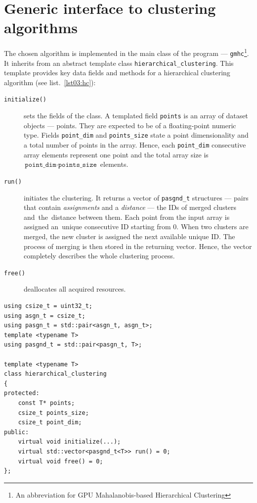 \section{Generic interface to clustering algorithms}

The chosen algorithm is implemented in the main class of the program --- \texttt{gmhc}\footnote{An abbreviation for GPU Mahalanobis-based Hierarchical Clustering}. It inherits from an abstract template class \texttt{hierarchical\_clustering}.
This template provides key data fields and methods for a hierarchical clustering algorithm (see list.~\ref{lst03:hc}): 

\begin{description}
	\item[\texttt{initialize()}] sets the fields of the class. A templated field \texttt{points} is an array of dataset objects --- points. They are expected to be of a floating-point numeric type. Fields \texttt{point\_dim} and \texttt{points\_size} state a point dimensionality and a total number of points in the array. Hence, each \texttt{point\_dim} consecutive array elements represent one point and the total array size is~$\texttt{point\_dim}\cdot\texttt{points\_size}$ elements.
	
	\item[\texttt{run()}] initiates the clustering. It returns a vector of \texttt{pasgnd\_t} structures --- pairs that contain \emph{assignments} and a \emph{distance} --- the IDs of merged clusters and~the~distance between them. Each point from the input array is assigned an~unique consecutive ID starting from $0$. When two clusters are merged, the new cluster is assigned the next available unique ID. The process of merging is then stored in the returning vector. Hence, the vector completely describes the whole clustering process.
	
	\item[\texttt{free()}] deallocates all acquired resources.
\end{description}

\begin{lstlisting}[caption={A summary of \texttt{hierarchical\_clustering} header file.},label={lst03:hc}]
using csize_t = uint32_t;
using asgn_t = csize_t;
using pasgn_t = std::pair<asgn_t, asgn_t>;
template <typename T>
using pasgnd_t = std::pair<pasgn_t, T>;

template <typename T>
class hierarchical_clustering
{
protected:
	const T* points;
	csize_t points_size;
	csize_t point_dim;
public:
	virtual void initialize(...);
	virtual std::vector<pasgnd_t<T>> run() = 0;
	virtual void free() = 0;
};
\end{lstlisting}

